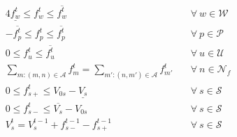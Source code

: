 \begin{alignat}{4}
    \underline{f_{w}^t} \leq f_{w}^t \leq \overline{f_{w}^t} &\quad \forall \ w \in \mathcal{W} \label{eq:well_limits} \\
    -\overline{f_{p}^t} \leq f_{p}^t \leq \overline{f_{p}^t} &\quad \forall \ p \in \mathcal{P} \label{eq:pipe_limits} \\
    0 \leq f_{u}^{t} \leq \overline{f_{u}^{t}} &\quad \forall \ u \in \mathcal{U} \label{eq:dem_limit_gas} \\
    \sum_{m:(m,n)\in\mathcal{A}}{f_{m}^t} = \sum_{m':(n,m')\in\mathcal{A}}{f_{m'}^t} &\quad \forall \ n \in \mathcal{N}_f \label{eq:gas_balance} \\
    0 \leq f_{s+}^t \leq V_{0s} - \underline{V_s} &\quad \forall \ s \in \mathcal{S} \label{eq:sto_limit1} \\ 
    0 \leq f_{s-}^t \leq \overline{V_s} - V_{0s} &\quad \forall \ s \in \mathcal{S} \label{eq:sto_limit2} \\ 
    V_{s}^t = V_{s}^{t-1} + f_{s-}^{t-1} - f_{s+}^{t-1} &\quad \forall \ s \in \mathcal{S} \label{eq:sto_time}\\
\end{alignat}

